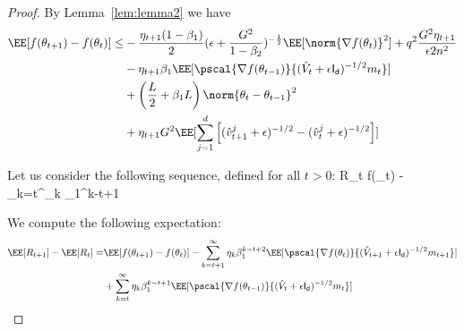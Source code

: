 \documentclass[11pt]{article}
\begin{document}
\begin{proof}
By Lemma~\ref{lem:lemma2} we have 
\begin{equation}
\begin{split}
\EE[f(\theta_{t+1}) - f(\theta_{t}) ] \leq &   - \frac{\eta_{t+1}(1-\beta_1)}{2}  (\epsilon + \frac{G^2}{1 - \beta_2})^{-\frac{1}{2}} \EE[\norm{\nabla f(\theta_t)}^2] +q^2 \frac{G^2 \eta_{t+1}}{\epsilon 2n^2} \\
&- \eta_{t+1} \beta_1\EE[\pscal{\nabla f(\theta_{t-1})}{(\hat{V}_{t} + \epsilon \mathsf{I_d})^{-1/2} m_{t}}]\\
& +  \left(\frac{L}{2} + \beta_1 L \right) \norm{\theta_t - \theta_{t-1}}^2\\
&+   \eta_{t+1} G^2 \EE[\sum_{j=1}^d \left[(\hat{v}^j_{t+1} + \epsilon )^{-1/2} - (\hat{v}^j_{t} + \epsilon )^{-1/2}  \right] ]
\end{split}
\end{equation}

Let us consider the following sequence, defined for all $t >0$:
\beq\label{eq:defR}
R_t \eqdef f(\theta_{t}) - \sum_{k=t}^\infty \eta_{k} \beta_1^{k-t+1}
\eeq

We compute the following expectation:
\begin{equation}
\begin{split}
\EE[R_{t+1}] - \EE[R_t] =& \EE[f(\theta_{t+1}) - f(\theta_{t}) ]  -  \sum_{k=t+1}^\infty \eta_{k} \beta_1^{k-t+2}\EE[\pscal{\nabla f(\theta_{t})}{(\hat{V}_{t+1} + \epsilon \mathsf{I_d})^{-1/2} m_{t+1}}] \\
& +  \sum_{k=t}^\infty \eta_{k} \beta_1^{k-t+1}\EE[\pscal{\nabla f(\theta_{t-1})}{(\hat{V}_{t} + \epsilon \mathsf{I_d})^{-1/2} m_{t}}]\\
\end{split}
\end{equation}


\end{proof}
\end{document}
